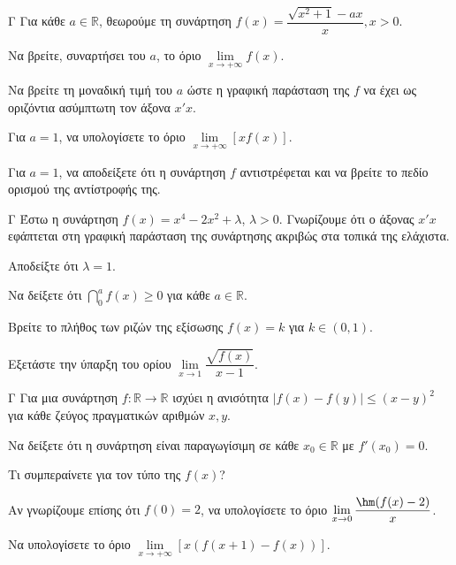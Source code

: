 \begin{thema}{Γ}
Για κάθε $a \in \mathbb{R}$, θεωρούμε τη συνάρτηση $f(x) = \dfrac{\sqrt{x^2+1} - a x}{x}, x > 0$.
\begin{erwthma}
  \item Να βρείτε, συναρτήσει του $a$, το όριο $\lim\limits_{x \to +\infty} f(x)$.
  \item Να βρείτε τη μοναδική τιμή του $a$ ώστε η γραφική παράσταση της $f$ να έχει ως οριζόντια ασύμπτωτη τον άξονα $x'x$.
  \item Για $a = 1$, να υπολογίσετε το όριο $\lim\limits_{x \to +\infty} [ x f(x) ]$.
  \item Για $a=1$, να αποδείξετε ότι η συνάρτηση $f$ αντιστρέφεται και να βρείτε το πεδίο ορισμού της αντίστροφής της.
\end{erwthma}
\end{thema}

\begin{thema}{Γ}
Έστω η συνάρτηση $f(x) = x^4 - 2x^2 + \lambda$, $\lambda > 0$. Γνωρίζουμε ότι ο άξονας $x'x$ εφάπτεται στη γραφική παράσταση της συνάρτησης ακριβώς στα τοπικά της ελάχιστα.
\begin{erwthma}
  \item Αποδείξτε ότι $\lambda = 1$.
  \item Να δείξετε ότι $\dint_{0}^{a}f(x) \ge 0$ για κάθε $a\in\mathbb{R}$.
  \item Βρείτε το πλήθος των ριζών της εξίσωσης $f(x) = k$ για $k \in (0, 1)$.
  \item Εξετάστε την ύπαρξη του ορίου $\lim\limits_{x \to 1} \dfrac{\sqrt{f(x)}}{x-1}$.
\end{erwthma}
\end{thema}

\begin{thema}{Γ}
Για μια συνάρτηση $f: \mathbb{R} \to \mathbb{R}$ ισχύει η ανισότητα $|f(x) - f(y)| \le (x-y)^2$ για κάθε ζεύγος πραγματικών αριθμών $x, y$.
\begin{erwthma}
  \item Να δείξετε ότι η συνάρτηση είναι παραγωγίσιμη σε κάθε $x_0 \in \mathbb{R}$ με $f'(x_0) = 0$.
  \item Τι συμπεραίνετε για τον τύπο της $f(x)$?
  \item Αν γνωρίζουμε επίσης ότι $f(0) = 2$, να υπολογίσετε το όριο $\lim\limits_{x \to 0} \dfrac{\hm(f(x) - 2)}{x}$.
  \item Να υπολογίσετε το όριο $\lim\limits_{x \to +\infty} [ x (f(x+1) - f(x)) ]$.
\end{erwthma}
\end{thema}

